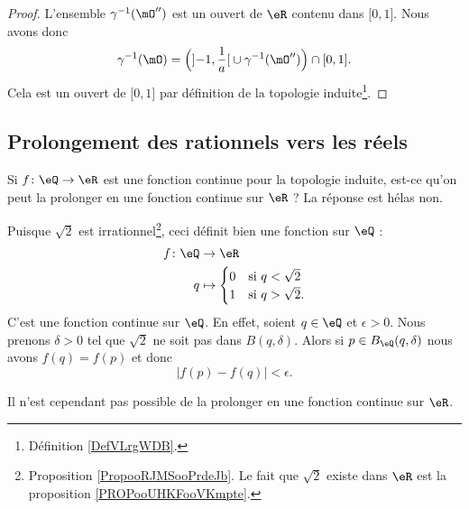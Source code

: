\begin{proof}
	L'ensemble \( \gamma^{-1}(\mO'')\) est un ouvert de \( \eR\) contenu dans \( \mathopen[ 0 , 1 \mathclose]\). Nous avons donc
	\begin{equation}
		\gamma^{-1}(\mO)=\Big( \mathopen] -1 , \frac{1}{ a } \mathclose[\cup\gamma^{-1}(\mO'') \Big)\cap \mathopen[ 0 , 1 \mathclose].
	\end{equation}
	Cela est un ouvert de \( \mathopen[ 0 , 1 \mathclose]\) par définition de la topologie induite\footnote{Définition \ref{DefVLrgWDB}.}.
\end{proof}

\subsection{Prolongement des rationnels vers les réels}

Si \( f\colon \eQ\to \eR\) est une fonction continue pour la topologie induite, est-ce qu'on peut la prolonger en une fonction continue sur \( \eR\) ? La réponse est hélas non.

\begin{example}       \label{EXooWZNCooQkKdtJ}
	Puisque \( \sqrt{ 2 }\) est irrationnel\footnote{Proposition \ref{PropooRJMSooPrdeJb}. Le fait que \( \sqrt{ 2 }\) existe dans \( \eR\) est la proposition \ref{PROPooUHKFooVKmpte}.}, ceci définit bien une fonction sur \( \eQ\) :
	\begin{equation}
		\begin{aligned}
			f\colon \eQ & \to \eR                           \\
			q           & \mapsto \begin{cases}
				0 & \text{si } q<\sqrt{ 2 } \\
				1 & \text{si } q>\sqrt{ 2 }.
			\end{cases}
		\end{aligned}
	\end{equation}
	C'est une fonction continue sur \( \eQ\). En effet, soient \( q\in \eQ\) et \( \epsilon>0\). Nous prenons \( \delta>0\) tel que \( \sqrt{ 2 }\) ne soit pas dans \( B(q,\delta)\). Alors si \( p\in B_{\eQ}(q,\delta)\) nous avons \( f(q)=f(p)\) et donc
	\begin{equation}
		| f(p)-f(q) |<\epsilon.
	\end{equation}

	Il n'est cependant pas possible de la prolonger en une fonction continue sur \( \eR\).
\end{example}

